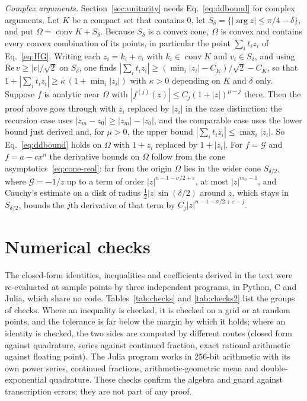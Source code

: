 \documentclass[a4paper,11pt]{article}
\begin{document}
\textit{Complex arguments.} Section~\ref{sec:unitarity} needs Eq.~\eqref{eq:ddbound} for complex arguments. Let $K$ be a compact set that contains $0$, let $S_\delta=\{|\arg z|\le\pi/4-\delta\}$, and put $\Omega=\operatorname{conv}K+S_\delta$. Because $S_\delta$ is a convex cone, $\Omega$ is convex and contains every convex combination of its points, in particular the point $\sum_it_iz_i$ of Eq.~\eqref{eq:HG}. Writing each $z_i=k_i+v_i$ with $k_i\in\operatorname{conv}K$ and $v_i\in S_\delta$, and using $\mathrm{Re}\,v\ge|v|/\sqrt2$ on $S_\delta$, one finds $|\sum_it_iz_i|\ge(\min_i|z_i|-C_K)/\sqrt2-C_K$, so that $1+|\sum_it_iz_i|\ge\kappa\,(1+\min_i|z_i|)$ with $\kappa>0$ depending on $K$ and $\delta$ only. Suppose $f$ is analytic near $\Omega$ with $|f^{(j)}(z)|\le C_j(1+|z|)^{\mu-j}$ there. Then the proof above goes through with $z_i$ replaced by $|z_i|$ in the case distinction: the recursion case uses $|z_m-z_0|\ge|z_m|-|z_0|$, and the comparable case uses the lower bound just derived and, for $\mu>0$, the upper bound $|\sum_it_iz_i|\le\max_i|z_i|$. So Eq.~\eqref{eq:ddbound} holds on $\Omega$ with $1+z_i$ replaced by $1+|z_i|$. For $f=\mathcal G$ and $f=a-cx^n$ the derivative bounds on $\Omega$ follow from the cone asymptotics~\eqref{eq:cone-real}: far from the origin $\Omega$ lies in the wider cone $S_{\delta/2}$, where $\mathcal G=-1/z$ up to a term of order $|z|^{n-1-\sigma/2+\varepsilon}$, at most $|z|^{m_\sigma-1}$, and Cauchy's estimate on a disk of radius $\frac12|z|\sin(\delta/2)$ around $z$, which stays in $S_{\delta/2}$, bounds the $j$th derivative of that term by $C_j|z|^{n-1-\sigma/2+\varepsilon-j}$.

\section{Numerical checks}
\label{app:checks}

The closed-form identities, inequalities and coefficients derived in the text were re-evaluated at sample points by three independent programs, in Python, C and Julia, which share no code. Tables~\ref{tab:checks} and \ref{tab:checks2} list the groups of checks. Where an inequality is checked, it is checked on a grid or at random points, and the tolerance is far below the margin by which it holds; where an identity is checked, the two sides are computed by different routes (closed form against quadrature, series against continued fraction, exact rational arithmetic against floating point). The Julia program works in 256-bit arithmetic with its own power series, continued fractions, arithmetic-geometric mean and double-exponential quadrature. These checks confirm the algebra and guard against transcription errors; they are not part of any proof.
\end{document}
